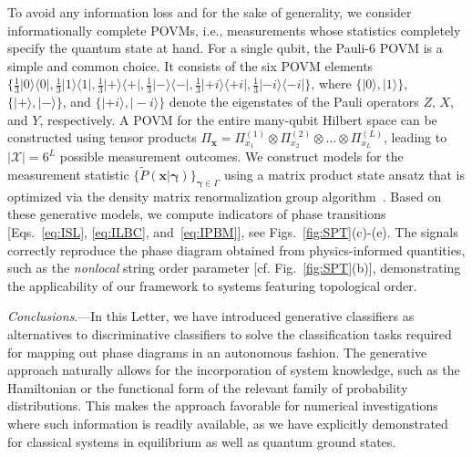 \documentclass[twocolumn,aps,prl,superscriptaddress,tightlines,nofootinbib]{revtex4-2}
\begin{document}
\indent To avoid any information loss and for the sake of generality, we consider informationally complete POVMs, i.e., measurements whose statistics completely specify the quantum state at hand. For a single qubit, the Pauli-$6$ POVM is a simple and common choice. It consists of the six POVM elements $\{ \frac{1}{3}| 0 \rangle \langle 0 |,\frac{1}{3}| 1 \rangle \langle 1 |,\frac{1}{3}| + \rangle \langle + |,\frac{1}{3}| - \rangle \langle - |,\frac{1}{3}| +i \rangle \langle +i |,\frac{1}{3}| -i \rangle \langle -i | \}$, where $\{ | 0 \rangle, | 1 \rangle\}$, $\{ | + \rangle, | - \rangle\}$, and $\{ | +i \rangle, | -i \rangle\}$ denote the eigenstates of the Pauli operators $Z$, $X$, and $Y$, respectively. A POVM for the entire many-qubit Hilbert space can be constructed using tensor products $\Pi_{\bm{x}} = \Pi_{x_{1}}^{(1)} \otimes \Pi_{x_{2}}^{(2)} \otimes \dots \otimes \Pi_{x_{L}}^{(L)}$, leading to $|\mathcal{X}| = 6^L$ possible measurement outcomes. We construct models for the measurement statistic $\{ \tilde{P}(\bm{x}|\bm{\gamma})\}_{\bm{\gamma} \in \Gamma}$ using a matrix product state ansatz that is optimized via the density matrix renormalization group algorithm~\cite{suppl}. Based on these generative models, we compute indicators of phase transitions [Eqs.~\eqref{eq:ISL}, \eqref{eq:ILBC}, and~\eqref{eq:IPBM}], see Figs.~\ref{fig:SPT}(c)-(e). The signals correctly reproduce the phase diagram obtained from physics-informed quantities, such as the \textit{nonlocal} string order parameter [cf. Fig.~\ref{fig:SPT}(b)], demonstrating the applicability of our framework to systems featuring topological order.

\emph{Conclusions}.---In this Letter, we have introduced generative classifiers as alternatives to discriminative classifiers to solve the classification tasks required for mapping out phase diagrams in an autonomous fashion. The generative approach naturally allows for the incorporation of system knowledge, such as the Hamiltonian or the functional form of the relevant family of probability distributions. This makes the approach favorable for numerical investigations where such information is readily available, as we have explicitly demonstrated for classical systems in equilibrium as well as quantum ground states.
\end{document}
